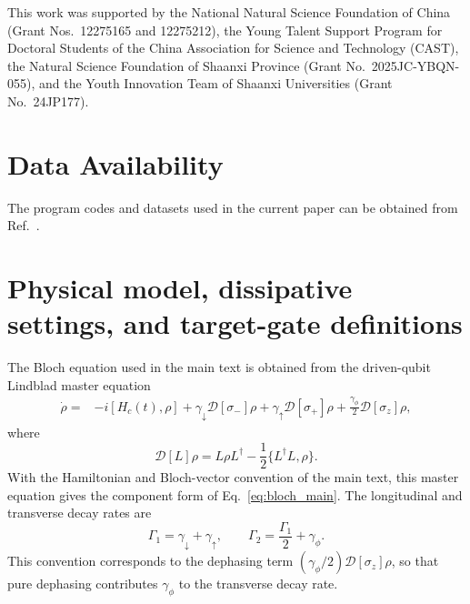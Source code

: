 \documentclass[aps,prx,reprint,superscriptaddress,nofootinbib,longbibliography,floatfix,showkeys]{revtex4-2}
\begin{document}
\begin{acknowledgments}
This work was supported by the National Natural Science Foundation
of China (Grant Nos.~12275165 and 12275212), the Young Talent Support Program for
Doctoral Students of the China Association for Science and Technology
(CAST), the Natural Science Foundation of Shaanxi Province
(Grant No.~2025JC-YBQN-055), and the Youth Innovation Team of Shaanxi Universities
(Grant No.~24JP177).
\end{acknowledgments}

\section*{Data Availability}
The program codes and datasets used in the current paper can be obtained from Ref.~\cite{repo:PINN-code}.


\FloatBarrier
\appendix

\setlength{\abovedisplayskip}{4pt plus 2pt minus 2pt}
\setlength{\belowdisplayskip}{4pt plus 2pt minus 2pt}
\setlength{\abovedisplayshortskip}{2pt plus 1pt minus 1pt}
\setlength{\belowdisplayshortskip}{2pt plus 1pt minus 1pt}


\section{Physical model, dissipative settings, and target-gate definitions}
\label{supp:physical_model}

The Bloch equation used in the main text is obtained from the driven-qubit
Lindblad master equation
\begin{equation}
\begin{aligned}
\dot\rho={}&-i[H_c(t),\rho]
+\gamma_\downarrow\mathcal D[\sigma_-]\rho
+\gamma_\uparrow\mathcal D[\sigma_+]\rho
+\frac{\gamma_\phi}{2}\mathcal D[\sigma_z]\rho ,
\end{aligned}
\label{eq:supp_master_equation}
\end{equation}
where
\begin{equation}
    \mathcal D[L]\rho=L\rho L^\dagger
    -\frac12\{L^\dagger L,\rho\}.
\end{equation}
With the Hamiltonian and Bloch-vector convention of the main text, this
master equation gives the component form of Eq.~\eqref{eq:bloch_main}.  The
longitudinal and transverse decay rates are
\begin{equation}
    \Gamma_1=\gamma_\downarrow+\gamma_\uparrow,
    \qquad
    \Gamma_2=\frac{\Gamma_1}{2}+\gamma_\phi .
    \label{eq:supp_Gamma_def}
\end{equation}
This convention corresponds to the dephasing term
$(\gamma_\phi/2)\mathcal D[\sigma_z]\rho$, so that pure dephasing contributes
$\gamma_\phi$ to the transverse decay rate.
\end{document}
